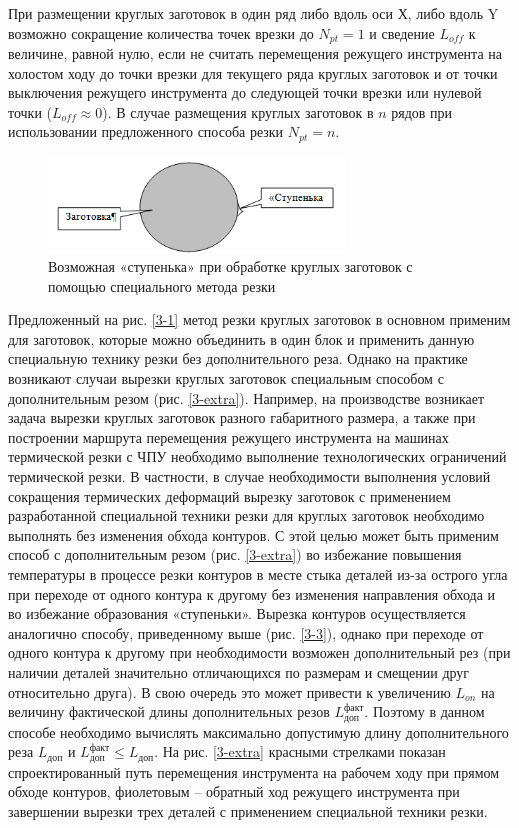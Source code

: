 \documentclass[12pt]{report}
\begin{document}
При размещении круглых заготовок в один ряд
либо вдоль оси Х, либо вдоль Y
возможно сокращение количества точек врезки до
$N_{pt}=1$
и сведение
$L_{off}$
к величине, равной нулю, если не считать перемещения
режущего инструмента на холостом ходу до точки врезки
для текущего ряда круглых заготовок и от точки выключения
режущего инструмента до следующей точки врезки или нулевой точки
($L_{off} \approx 0$).
В случае размещения круглых заготовок в $n$
рядов при использовании предложенного способа резки
$N_{pt}=n$.

\begin{figure}
  \begin{center}
  \includegraphics[width=0.7\textwidth]{hiccup.png}
  \caption{Возможная «ступенька» при обработке круглых заготовок с помощью специального метода резки}
  \label{hiccup}
  \end{center}
\end{figure}

Предложенный на рис. \ref{3-1}
метод резки круглых заготовок в основном применим для заготовок,
которые можно объединить в один блок и применить
данную специальную технику резки без дополнительного реза.
Однако на практике возникают случаи вырезки круглых заготовок
специальным способом с дополнительным резом
(рис. \ref{3-extra}).
Например, на производстве возникает задача
вырезки круглых заготовок разного габаритного размера,
а
также при построении маршрута перемещения режущего инструмента
на машинах термической резки с ЧПУ необходимо выполнение
технологических ограничений термической резки.
В частности, в случае необходимости выполнения условий
сокращения термических деформаций вырезку заготовок с
применением разработанной специальной техники резки
для круглых заготовок необходимо выполнять без изменения обхода контуров.
С этой целью может быть применим способ с дополнительным резом
(рис. \ref{3-extra})
во избежание повышения температуры в процессе резки контуров
в месте стыка деталей из-за острого угла
при переходе от одного контура к другому без изменения
направления обхода и во избежание образования «ступеньки».
Вырезка контуров осуществляется аналогично способу,
приведенному выше (рис. \ref{3-3}),
однако при переходе от одного контура к другому
при необходимости возможен дополнительный рез
(при наличии деталей значительно отличающихся по размерам и смещении друг относительно друга).
В свою очередь это может привести к увеличению
$L_{on}$
на величину фактической длины дополнительных резов
$L_\text{доп}^\text{факт}$.
Поэтому в данном способе необходимо вычислять максимально допустимую длину дополнительного реза
$L_\text{доп}$
и
$L_\text{доп}^\text{факт} \leqslant L_\text{доп}$.
На рис. \ref{3-extra}
красными стрелками показан спроектированный путь
перемещения инструмента на рабочем ходу при прямом обходе контуров,
фиолетовым – обратный ход режущего инструмента
при завершении вырезки трех деталей с
применением специальной техники резки.
\end{document}
